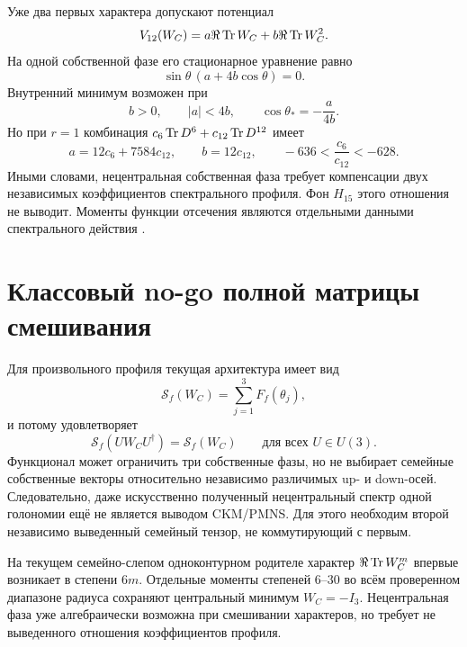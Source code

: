 Уже два первых характера допускают потенциал
\begin{equation}
 V_{12}(W_C)=a\Re\operatorname{Tr} W_C+b\Re\operatorname{Tr} W_C^2.
 \label{eq:v7-higher-character-two-harmonic-potential}
\end{equation}
На одной собственной фазе его стационарное уравнение равно
\begin{equation}
 \sin\theta\,(a+4b\cos\theta)=0.
 \label{eq:v7-higher-character-stationarity}
\end{equation}
Внутренний минимум возможен при
\begin{equation}
 b>0,
 \qquad |a|<4b,
 \qquad
 \cos\theta_*=-\frac{a}{4b}.
 \label{eq:v7-higher-character-interior-condition}
\end{equation}
Но при $r=1$ комбинация $c_6\operatorname{Tr} D^6+c_{12}\operatorname{Tr} D^{12}$ имеет
\begin{equation}
 a=12c_6+7584c_{12},
 \qquad b=12c_{12},
 \qquad
 -636<\frac{c_6}{c_{12}}<-628.
 \label{eq:v7-higher-character-tuned-ratio}
\end{equation}
Иными словами, нецентральная собственная фаза требует компенсации двух
независимых коэффициентов спектрального профиля. Фон $H_{15}$ этого
отношения не выводит. Моменты функции отсечения являются отдельными данными
спектрального действия \cite{v7-higher-character-spectral-action}.

\section{Классовый no-go полной матрицы смешивания}

Для произвольного профиля текущая архитектура имеет вид
\begin{equation}
 \mathcal S_f(W_C)=\sum_{j=1}^3F_f(\theta_j),
 \label{eq:v7-higher-character-separable-action}
\end{equation}
и потому удовлетворяет
\begin{equation}
 \mathcal S_f(UW_CU^\dagger)=\mathcal S_f(W_C)
 \qquad\text{для всех }U\in U(3).
 \label{eq:v7-higher-character-conjugation-invariance}
\end{equation}
Функционал может ограничить три собственные фазы, но не выбирает семейные
собственные векторы относительно независимо различимых up- и down-осей.
Следовательно, даже искусственно полученный нецентральный спектр одной
голономии ещё не является выводом CKM/PMNS. Для этого необходим второй
независимо выведенный семейный тензор, не коммутирующий с первым.

\begin{theorem}
На текущем семейно-слепом одноконтурном родителе характер
$\Re\operatorname{Tr} W_C^m$ впервые возникает в степени $6m$. Отдельные моменты степеней
$6$--$30$ во всём проверенном диапазоне радиуса сохраняют центральный минимум
$W_C=-I_3$. Нецентральная фаза уже алгебраически возможна при смешивании
характеров, но требует не выведенного отношения коэффициентов профиля.
\end{theorem}

